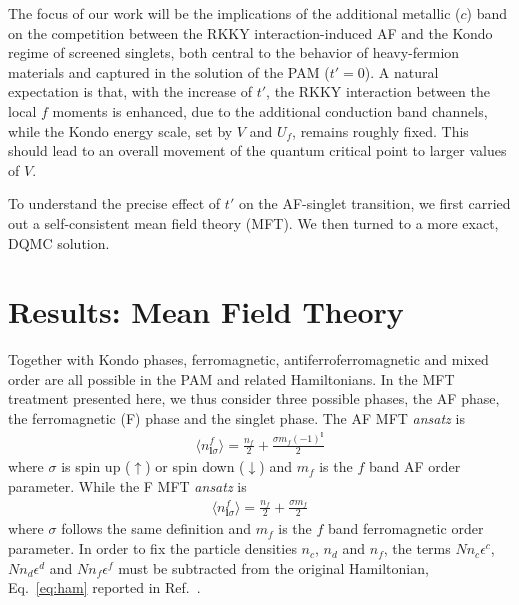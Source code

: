 \documentclass[pra,letterpaper,10pt,twocolumn]{revtex4}
\begin{document}
The focus of our work will be the implications of the additional
metallic ($c$) band on the competition between the RKKY
interaction-induced AF  and the Kondo regime of screened singlets, both
central to the behavior of heavy-fermion
materials\cite{stewart84,lee86,Georges96} and 
captured in the solution of the PAM ($t'=0$).  A
natural expectation is that, with the increase of $t'$, the RKKY
interaction between the local $f$ moments is enhanced, due to the
additional conduction band channels, while the Kondo energy scale, set
by $V$ and $U_f$, remains roughly fixed.  This should lead to an overall
movement of the quantum critical point to larger values of $V$.

To understand the precise effect of $t'$ on the AF-singlet transition, we first
carried out a self-consistent mean field theory (MFT).  We then turned
to a more exact, DQMC solution.

\section{Results:  Mean Field Theory}

Together with Kondo phases,
ferromagnetic, antiferroferromagnetic and mixed order are all
possible in the PAM and related Hamiltonians\cite{bernhard15,eder16}.
In the MFT treatment presented here, we thus consider three possible
phases, the AF phase, the ferromagnetic (F) phase and the singlet phase.
The AF MFT {\it ansatz} is
\begin{align}
\langle n^f_{\textbf{l}\sigma}\rangle=\frac{n_f}{2}+
\frac{\sigma m_f (-1)^{\textbf{l}}}{2}
\label{eq:MFT_AFM}
\end{align}
where $\sigma$ is spin up ($\uparrow$) or spin down ($\downarrow$) and
$m_f$ is the $f$ band AF order parameter. While the F MFT {\it ansatz} is
\begin{align}
\langle n^f_{\textbf{l}\sigma}\rangle=\frac{n_f}{2}+
\frac{\sigma m_f}{2}
\label{eq:MFT_FM}
\end{align}  
where $\sigma$ follows the same definition and $m_f$ is the $f$ band
ferromagnetic order parameter. In order to fix the particle densities
$n_c$, $n_d$ and $n_f$, the terms $N n_c \epsilon^c$, $N n_d \epsilon^d$
and $N n_f \epsilon^f$ must be subtracted from the original Hamiltonian,
Eq.~\ref{eq:ham} reported in Ref.~\cite{Costaa}.
\end{document}
